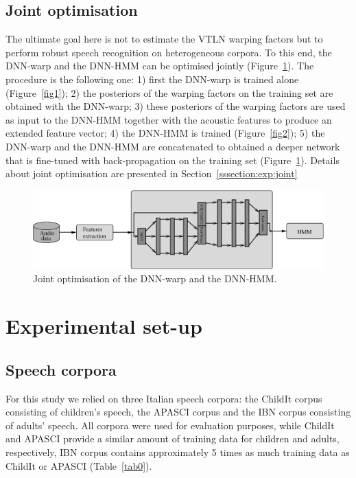 \documentclass{nle}
\begin{document}
\subsection{Joint optimisation}
The ultimate goal here is not to estimate the VTLN warping factors but to perform robust speech recognition on heterogeneous corpora. To this end, the DNN-warp and the DNN-HMM can be optimised jointly (Figure~\ref{fig3}). The procedure is the following one: 1) first the DNN-warp is trained alone (Figure~\ref{fig1}); 2) the posteriors of the warping factors on the training set are obtained with the DNN-warp; 3) these posteriors of the warping factors are used as input to the DNN-HMM together with the acoustic features to produce an extended feature vector; 4) the DNN-HMM is trained (Figure~\ref{fig2}); 5)  the DNN-warp and the DNN-HMM are concatenated to obtained a deeper network that is fine-tuned with back-propagation on the training set (Figure~\ref{fig3}). Details about joint optimisation are presented in Section~\ref{sssection:exp:joint}

  \begin{figure}
       \includegraphics[width=\textwidth]{fig3}
          \caption{Joint optimisation of the DNN-warp and the DNN-HMM.} 
     	\label{fig3}
  \end{figure}

\section{Experimental set-up}\label{section:expS}
\subsection{Speech corpora}

For  this study  we  relied  on three  Italian  speech corpora:  the
ChildIt corpus  consisting of children's speech,  the APASCI corpus and the IBN corpus consisting of  
adults'  speech.    All  corpora  were  used  for
evaluation purposes, while ChildIt and APASCI provide a similar
amount of training data for children and adults, respectively, IBN corpus contains  approximately 5 times as much training data as ChildIt or APASCI (Table~\ref{tab0}).
\end{document}
